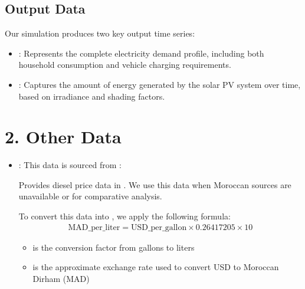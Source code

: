 \documentclass[letterpaper,10pt,english]{sphinxmanual}
\begin{document}
\subsection{Output Data}
\label{\detokenize{index:output-data}}
\sphinxAtStartPar
Our simulation produces two key output time series:
\begin{itemize}
\item {} 
\sphinxAtStartPar
{}:
Represents the complete electricity demand profile, including both household consumption and vehicle charging requirements.

\item {} 
\sphinxAtStartPar
{}:
Captures the amount of energy generated by the solar PV system over time, based on irradiance and shading factors.

\end{itemize}


\section{2. Other Data}
\label{\detokenize{index:other-data}}\begin{itemize}
\item {} 
\sphinxAtStartPar
{}:
This data is sourced from
:

\sphinxAtStartPar
Provides diesel price data in . We use this data when Moroccan sources are unavailable or for comparative analysis.

\sphinxAtStartPar
To convert this data into , we apply the following formula:
\begin{equation*}
\begin{split}\text{MAD_per_liter} = \text{USD_per_gallon} \times 0.26417205 \times 10\end{split}
\end{equation*}\begin{itemize}
\item {} 
\sphinxAtStartPar
{} is the conversion factor from gallons to liters

\item {} 
\sphinxAtStartPar
{} is the approximate exchange rate used to convert USD to Moroccan Dirham (MAD)

\end{itemize}

\end{itemize}
\end{document}
